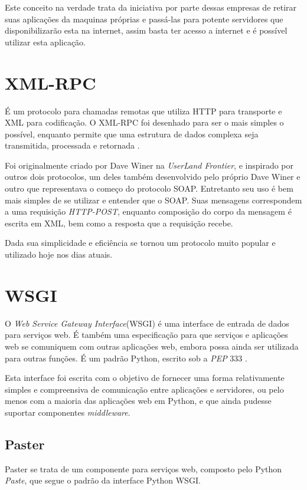 Este conceito na verdade trata da iniciativa por parte dessas empresas de retirar suas aplicações da maquinas próprias e passá-las para potente servidores que disponibilizarão esta na internet, assim basta ter acesso a internet e é possível utilizar esta aplicação.


\section{XML-RPC}

É um protocolo para chamadas remotas que utiliza HTTP para transporte e XML para codificação. O XML-RPC foi desenhado para ser o mais simples o possível, enquanto permite que uma estrutura de dados complexa seja transmitida, processada e retornada \cite{XMLRPC}.

Foi originalmente criado por Dave Winer na \textit{UserLand Frontier}, e inspirado por outros dois protocolos, um deles também desenvolvido pelo próprio Dave Winer e outro que representava o começo do protocolo SOAP. Entretanto seu uso é bem mais simples de se utilizar e entender que o SOAP. Suas mensagens correspondem a uma requisição \textit{HTTP-POST}, enquanto composição do corpo da mensagem é escrita em XML, bem como a resposta que a requisição recebe.

Dada sua simplicidade e eficiência se tornou um protocolo muito popular e utilizado hoje nos dias atuais.


\section{WSGI}

O \textit{Web Service Gateway Interface}(WSGI) é uma interface de entrada de dados para serviços web. É também uma especificação para que serviços e aplicações web se comuniquem com outras aplicações web, embora possa ainda ser utilizada para outras funções. É um padrão Python, escrito sob a \textit{PEP} 333 \cite{WSGI}.

Esta interface foi escrita com o objetivo de fornecer uma forma relativamente simples e compreensiva de comunicação entre aplicações e servidores, ou pelo menos com a maioria das aplicações web em Python, e que ainda pudesse suportar componentes \textit{middleware}.


\subsection{Paster}

Paster se trata de um componente para serviços web, composto pelo Python \textit{Paste}, que segue o padrão da interface Python WSGI.

